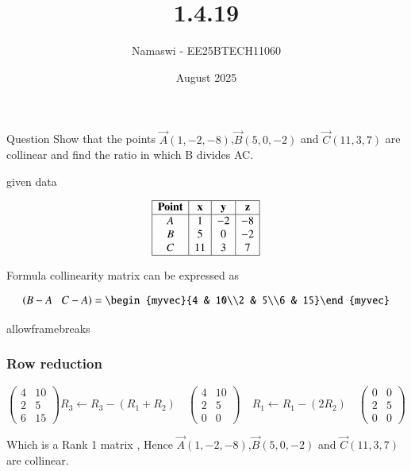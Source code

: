 \documentclass{beamer}
\title %
{1.4.19}
\date{August  2025}
\author %
{Namaswi - EE25BTECH11060}
\begin{document}
\frame{\titlepage}
\begin{frame}{Question}
 Show that the points $\vec{A}(1,-2,-8)$,$\vec{B}(5,0,-2)$ and $\vec{C}(11,3,7)$ are collinear and find the ratio in which B divides AC.
 
 

\end{frame}
 
\begin{frame}{given data}
 

\[
\begin{array}{|c|c|c|c|}
\hline
\textbf{Point} & \textbf{x} & \textbf{y} & \textbf{z} \\
\hline
A & 1 & -2 & -8 \\
B & 5 & 0 & -2 \\
C & 11 & 3 & 7 \\
\hline
\end{array}
\]

   
\end{frame}

\begin{frame}{Formula}
  collinearity matrix can be expressed as 

\begin{align*}
  \brak{B-A\;\;\;C-A} =\begin{myvec}{4  & 10\\2 & 5\\6  & 15}\end{myvec}
 \end{align*}
\end{frame}
 


\begin{frame}{allowframebreaks}
\frametitle{Row reduction}

     
 

\[
\left(
\begin{array}{cc}
4 & 10 \\
2 & 5 \\
6 & 15
\end{array}
\right)
R_3 \leftarrow R_3 - (R_1 + R_2)
\quad
\left(
\begin{array}{cc}
4 & 10 \\
2 & 5 \\
0 & 0
\end{array}
\right)
\quad
R_1 \leftarrow R_1 - (2R_2)
\quad
\left(
\begin{array}{cc}
0 & 0 \\
2 & 5 \\
0 & 0
\end{array}
\right)
\]
 

Which is a Rank 1 matrix , Hence   $\vec{A}(1,-2,-8)$,$\vec{B}(5,0,-2)$ and $\vec{C}(11,3,7)$ are collinear.
\end{frame}
\end{document}
